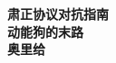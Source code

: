 \documentclass[11pt]{article}
\begin{document}
    \begin{titlepage}
        \begin{center}
            \vspace*{1cm}
            \Large{\textbf{肃正协议对抗指南}}\\[2mm]
            \large{\textbf{动能狗的末路}}\\
            \LARGE{\textbf{奥里给}}
        \end{center}
    \end{titlepage}
 
    
\end{document}
